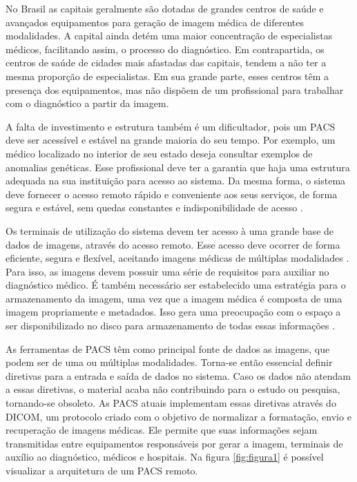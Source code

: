 No Brasil as capitais geralmente são dotadas de grandes centros de saúde e avançados equipamentos para geração de imagem médica de diferentes modalidades.
A capital ainda detém uma maior concentração de especialistas médicos, facilitando assim, o processo do diagnóstico.
Em contrapartida, os centros de saúde de cidades mais afastadas das capitais, tendem a não ter a mesma proporção de especialistas.
Em sua grande parte, esses centros têm a presença dos equipamentos, mas não dispõem de um profissional para trabalhar com o diagnóstico a partir da imagem.

A falta de investimento e estrutura também é um dificultador, pois um PACS deve ser acessível e estável na grande maioria do seu tempo.
Por exemplo, um médico localizado no interior de seu estado deseja consultar exemplos de anomalias genéticas.
Esse profissional deve ter a garantia que haja uma estrutura adequada na sua instituição para acesso ao sistema.
Da mesma forma, o sistema deve fornecer o acesso remoto rápido e conveniente aos seus serviços, de forma segura e estável, sem quedas constantes e indisponibilidade de acesso \cite{REF19}.

Os terminais de utilização do sistema devem ter acesso à uma grande base de dados de imagens, através do acesso remoto.
Esse acesso deve ocorrer de forma eficiente, segura e flexível, aceitando imagens médicas de múltiplas modalidades \cite{REF18}.
Para isso, as imagens devem possuir uma série de requisitos para auxiliar no diagnóstico médico.
É também necessário ser estabelecido uma estratégia para o armazenamento da imagem, uma vez que a imagem médica é composta de uma imagem propriamente e metadados.
Isso gera uma preocupação com o espaço a ser disponibilizado no disco para armazenamento de todas essas informações \cite{REF10}.

As ferramentas de PACS têm como principal fonte de dados as imagens, que podem ser de uma ou múltiplas modalidades.
Torna-se então essencial definir diretivas para a entrada e saída de dados no sistema.
Caso os dados não atendam a essas diretivas, o material acaba não contribuindo para o estudo ou pesquisa, tornando-se obsoleto.
As PACS atuais implementam essas diretivas através do DICOM, um protocolo criado com o objetivo de normalizar a formatação, envio e recuperação de imagens médicas.
Ele permite que suas informações sejam transmitidas entre equipamentos responsáveis por gerar a imagem, terminais de auxílio ao diagnóstico, médicos e hospitais. Na figura \ref{fig:figura1} é possível visualizar a arquitetura de um PACS remoto.

